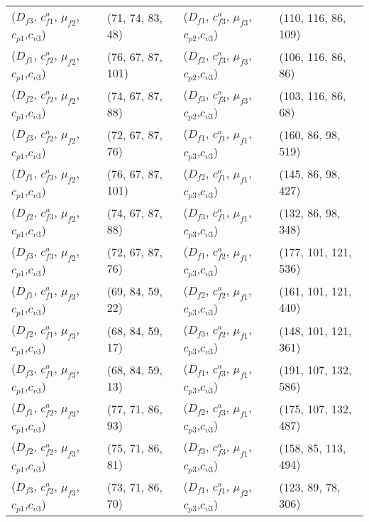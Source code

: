 \documentclass[preprint,12pt]{elsarticle}
\begin{document}
\begin{appendices}
\begin{table}[htbp]
\begin{tabular}{llll}
    ($D_{f3}$, $c^{a}_{f1}$, $\mu_{f2}$, $c_{p1}$,$c_{v3}$) & (71, 74, 83, 48) & ($D_{f1}$, $c^{a}_{f3}$, $\mu_{f3}$, $c_{p2}$,$c_{v3}$) & (110, 116, 86, 109) \\
    ($D_{f1}$, $c^{a}_{f2}$, $\mu_{f2}$, $c_{p1}$,$c_{v3}$) & (76, 67, 87, 101) & ($D_{f2}$, $c^{a}_{f3}$, $\mu_{f3}$, $c_{p2}$,$c_{v3}$) & (106, 116, 86, 86) \\
    ($D_{f2}$, $c^{a}_{f2}$, $\mu_{f2}$, $c_{p1}$,$c_{v3}$) & (74, 67, 87, 88) & ($D_{f3}$, $c^{a}_{f3}$, $\mu_{f3}$, $c_{p2}$,$c_{v3}$) & (103, 116, 86, 68) \\
    ($D_{f3}$, $c^{a}_{f2}$, $\mu_{f2}$, $c_{p1}$,$c_{v3}$) & (72, 67, 87, 76) & ($D_{f1}$, $c^{a}_{f1}$, $\mu_{f1}$, $c_{p3}$,$c_{v3}$) & (160, 86, 98, 519) \\
    ($D_{f1}$, $c^{a}_{f3}$, $\mu_{f2}$, $c_{p1}$,$c_{v3}$) & (76, 67, 87, 101) & ($D_{f2}$, $c^{a}_{f1}$, $\mu_{f1}$, $c_{p3}$,$c_{v3}$) & (145, 86, 98, 427) \\
    ($D_{f2}$, $c^{a}_{f3}$, $\mu_{f2}$, $c_{p1}$,$c_{v3}$) & (74, 67, 87, 88) & ($D_{f3}$, $c^{a}_{f1}$, $\mu_{f1}$, $c_{p3}$,$c_{v3}$) & (132, 86, 98, 348) \\
    ($D_{f3}$, $c^{a}_{f3}$, $\mu_{f2}$, $c_{p1}$,$c_{v3}$) & (72, 67, 87, 76) & ($D_{f1}$, $c^{a}_{f2}$, $\mu_{f1}$, $c_{p3}$,$c_{v3}$) & (177, 101, 121, 536) \\
    ($D_{f1}$, $c^{a}_{f1}$, $\mu_{f3}$, $c_{p1}$,$c_{v3}$) & (69, 84, 59, 22) & ($D_{f2}$, $c^{a}_{f2}$, $\mu_{f1}$, $c_{p3}$,$c_{v3}$) & (161, 101, 121, 440) \\
    ($D_{f2}$, $c^{a}_{f1}$, $\mu_{f3}$, $c_{p1}$,$c_{v3}$) & (68, 84, 59, 17) & ($D_{f3}$, $c^{a}_{f2}$, $\mu_{f1}$, $c_{p3}$,$c_{v3}$) & (148, 101, 121, 361) \\
    ($D_{f3}$, $c^{a}_{f1}$, $\mu_{f3}$, $c_{p1}$,$c_{v3}$) & (68, 84, 59, 13) & ($D_{f1}$, $c^{a}_{f3}$, $\mu_{f1}$, $c_{p3}$,$c_{v3}$) & (191, 107, 132, 586) \\
    ($D_{f1}$, $c^{a}_{f2}$, $\mu_{f3}$, $c_{p1}$,$c_{v3}$) & (77, 71, 86, 93) & ($D_{f2}$, $c^{a}_{f3}$, $\mu_{f1}$, $c_{p3}$,$c_{v3}$) & (175, 107, 132, 487) \\
    ($D_{f2}$, $c^{a}_{f2}$, $\mu_{f3}$, $c_{p1}$,$c_{v3}$) & (75, 71, 86, 81) & ($D_{f3}$, $c^{a}_{f3}$, $\mu_{f1}$, $c_{p3}$,$c_{v3}$) & (158, 85, 113, 494) \\
    ($D_{f3}$, $c^{a}_{f2}$, $\mu_{f3}$, $c_{p1}$,$c_{v3}$) & (73, 71, 86, 70) & ($D_{f1}$, $c^{a}_{f1}$, $\mu_{f2}$, $c_{p3}$,$c_{v3}$) & (123, 89, 78, 306) \\

\end{tabular}
\end{table}
\end{appendices}
\end{document}
